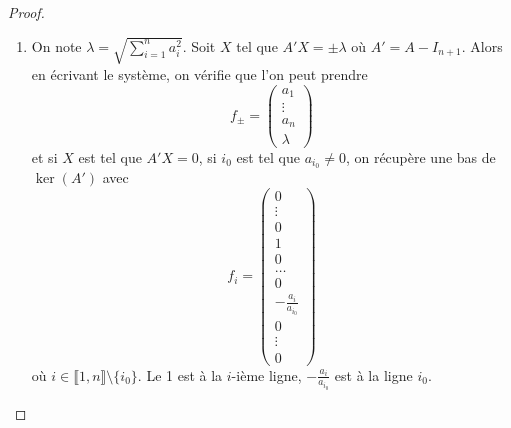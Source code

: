 \documentclass[12pt]{article}
\begin{document}
\begin{proof}
\begin{enumerate}
		\item On note $\lambda=\sqrt{\sum_{i=1}^{n}a_{i}^{2}}$. Soit $X$ tel que $A'X=\pm\lambda$ où $A'=A-I_{n+1}$. Alors en écrivant le système, on vérifie que l'on peut prendre 
		\begin{equation}
			f_{\pm}=\begin{pmatrix}
				a_{1}\\
				\vdots\\
				a_{n}\\
				\lambda
			\end{pmatrix}	
		\end{equation}
		et si $X$ est tel que $A'X=0$, si $i_{0}$ est tel que $a_{i_{0}}\neq0$, on récupère une bas de $\ker(A')$ avec 
		\begin{equation}
			f_{i}=\begin{pmatrix}
				0\\
				\vdots\\
				0\\
				1\\
				0\\
				\dots\\
				0\\
				-\frac{a_{i}}{a_{i_{0}}}\\
				0\\
				\vdots\\
				0
			\end{pmatrix}
		\end{equation}
		où $i\in\llbracket1,n\rrbracket\setminus\lbrace i_{0}\rbrace$. Le 1 est à la $i$-ième ligne, $-\frac{a_{i}}{a_{i_{0}}}$ est à la ligne $i_{0}$.
	\end{enumerate}
\end{proof}
\end{document}
